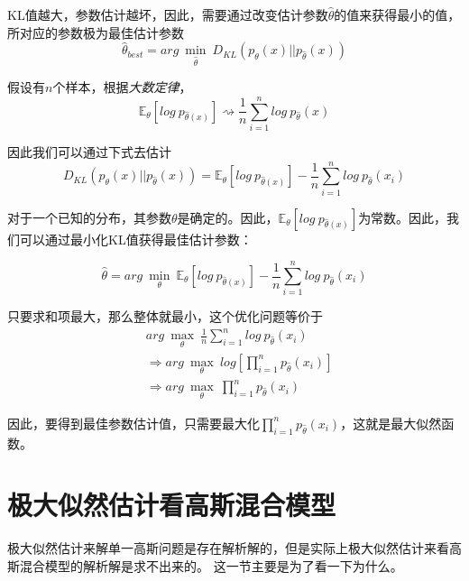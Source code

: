 KL值越大，参数估计越坏，因此，需要通过改变估计参数$\hat{\theta}$的值来获得最小的值，所对应的参数极为最佳估计参数
\begin{equation}
    \hat{\theta}_{best}=arg\ \min\limits_{\hat{\theta}}\ D_{KL}(p_\theta(x)||p_{\hat{\theta}}(x))
\end{equation}

假设有$n$个样本，根据\textsl{大数定律}，
\begin{equation}
    \mathbb{E}_{\theta}[log\ p_{\hat{\theta}(x)}]\rightsquigarrow \frac{1}{n}\sum\limits_{i=1}^{n}log\ p_{\hat{\theta}}(x)
\end{equation}

因此我们可以通过下式去估计
\begin{equation}
    D_{KL}(p_{\theta}(x)||p_{\hat{\theta}}(x))=\mathbb{E}_{\theta}[log\ p_{\hat{\theta}(x)}]-\frac{1}{n}\sum\limits_{i=1}^{n}log\ p_{\hat{\theta}}(x_i)
\end{equation}

对于一个已知的分布，其参数$\theta$是确定的。因此，$\mathbb{E}_{\theta}[log\ p_{\hat{\theta}(x)}]$为常数。因此，我们可以通过最小化KL值获得最佳估计参数：

\begin{equation}
    \hat{\theta}=arg\ \min\limits_{\theta}\ \mathbb{E}_{\theta}[log\ p_{\hat{\theta}(x)}]-\frac{1}{n}\sum\limits_{i=1}^{n}log\ p_{\hat{\theta}}(x_i)
\end{equation}

只要求和项最大，那么整体就最小，这个优化问题等价于
\begin{equation}
    \begin{aligned}
        & arg\ \max\limits_{\theta}\ \frac{1}{n}\sum\limits_{i=1}^{n}log\ p_{\hat{\theta}}(x_i)\\
        & \Rightarrow arg\ \max\limits_{\theta}\ log[\prod\limits_{i=1}^{n}p_{\hat{\theta}}(x_i)]\\
        & \Rightarrow arg\ \max\limits_{\theta}\ \prod\limits_{i=1}^{n}p_{\hat{\theta}}(x_i)
    \end{aligned}
\end{equation}

因此，要得到最佳参数估计值，只需要最大化$\prod\limits_{i=1}^{n}p_{\hat{\theta}}(x_i)$，这就是最大似然函数。

\section{极大似然估计看高斯混合模型}

极大似然估计来解单一高斯问题是存在解析解的，但是实际上极大似然估计来看高斯混合模型的解析解是求不出来的。
这一节主要是为了看一下为什么。


